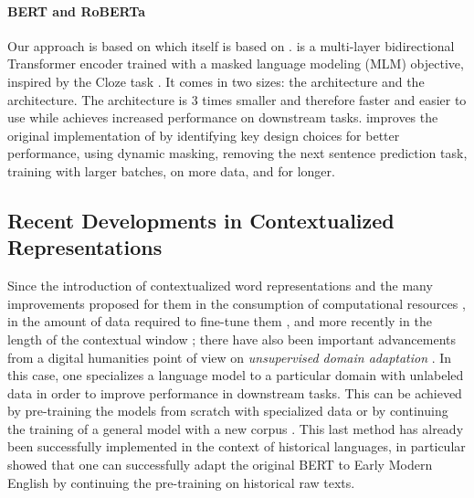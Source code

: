 \paragraph{BERT and RoBERTa} Our approach is based on \roberta \citep{liu-etal-2019-roberta} which itself is based on \bert \citep{devlin-etal-2019-bert}. \bert is a multi-layer bidirectional Transformer encoder trained with a masked language modeling (MLM) objective, inspired by the Cloze task \citep{taylor-1953-cloze}. It comes in two sizes: the \bertbase architecture and the \bertlarge architecture. The \bertbase architecture is 3 times smaller and therefore faster and easier to use while \bertlarge achieves increased performance on downstream tasks. \roberta improves the original implementation of \bert by identifying key design choices for better performance, using dynamic masking, removing the next sentence prediction task, training with larger batches, on more data, and for longer.

\subsection{Recent Developments in Contextualized Representations}
Since the introduction of contextualized word representations \citep{peters-etal-2018-deep,akbik-etal-2018-contextual,devlin-etal-2019-bert} and the many improvements proposed for them in the consumption of computational resources \citep{clark-etal-2020-electra}, in the amount of data required to fine-tune them \citep{raffel-etal-2020-exploring}, and more recently in the length of the contextual window \citep{xiong-etal-2021-nystromformer}; there have also been important advancements from a digital humanities point of view on \emph{unsupervised domain adaptation} \citep{ramponi-plank-2020-neural}. In this case, one specializes a language model to a particular domain with unlabeled data in order to improve performance in downstream tasks. This can be achieved by  pre-training the models from scratch with specialized data \citep{beltagy-etal-2019-scibert} or by continuing the training of a general model with a new corpus \citep{lee-etal-2019-BioBERT, peng-etal-2019-transfer}. This last method has already been successfully implemented in the context of historical languages, in particular \citet{han-eisenstein-2019-unsupervised} showed that one can successfully adapt the original BERT \citep{devlin-etal-2019-bert} to Early Modern English by continuing the pre-training on historical raw texts.

